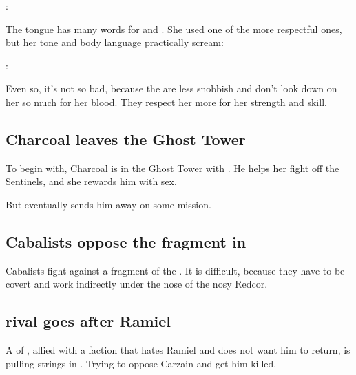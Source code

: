\Mystraacht: 

The \resphan{} tongue has many words for  and . 
She used one of the more respectful ones, but her tone and body language practically scream: 

\Achsah: 

Even so, it's not so bad, because the \Mystraacht{} are less snobbish and don't look down on her so much for her blood. 
They respect her more for her strength and skill. 









\subsection{Charcoal leaves the Ghost Tower}
To begin with, Charcoal is in the Ghost Tower with \Achsah. He helps her fight off the Sentinels, and she rewards him with sex. 

But eventually \Achsah{} sends him away on some mission. 









\subsection{Cabalists oppose the \Haskelek{} fragment in \Redce}
\Redcean{} Cabalists fight against a fragment of the \Haskelek. 
It is difficult, because they have to be covert and work indirectly under the nose of the nosy Redcor. 









\subsection[Mystraacht rival goes after Ramiel]{\Mystraacht rival goes after Ramiel}
A \resphan{} of \Mystraacht, allied with a faction that hates Ramiel and does not want him to return, is pulling strings in \Redce. 
Trying to oppose Carzain and get him killed. 

